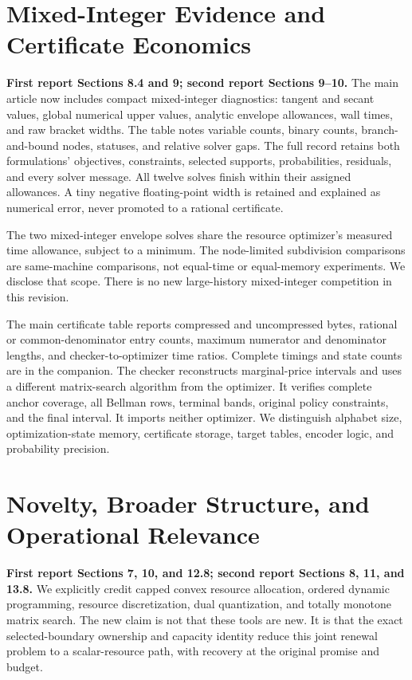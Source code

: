 \section{Mixed-Integer Evidence and Certificate Economics}
\textbf{First report Sections 8.4 and 9; second report Sections 9--10.}
The main article now includes compact mixed-integer diagnostics: tangent and secant values, global numerical upper values, analytic envelope allowances, wall times, and raw bracket widths. The table notes variable counts, binary counts, branch-and-bound nodes, statuses, and relative solver gaps. The full record retains both formulations' objectives, constraints, selected supports, probabilities, residuals, and every solver message. All twelve solves finish within their assigned allowances. A tiny negative floating-point width is retained and explained as numerical error, never promoted to a rational certificate.

The two mixed-integer envelope solves share the resource optimizer's measured time allowance, subject to a minimum. The node-limited subdivision comparisons are same-machine comparisons, not equal-time or equal-memory experiments. We disclose that scope. There is no new large-history mixed-integer competition in this revision.

The main certificate table reports compressed and uncompressed bytes, rational or common-denominator entry counts, maximum numerator and denominator lengths, and checker-to-optimizer time ratios. Complete timings and state counts are in the companion. The checker reconstructs marginal-price intervals and uses a different matrix-search algorithm from the optimizer. It verifies complete anchor coverage, all Bellman rows, terminal bands, original policy constraints, and the final interval. It imports neither optimizer. We distinguish alphabet size, optimization-state memory, certificate storage, target tables, encoder logic, and probability precision.

\section{Novelty, Broader Structure, and Operational Relevance}
\textbf{First report Sections 7, 10, and 12.8; second report Sections 8, 11, and 13.8.}
We explicitly credit capped convex resource allocation, ordered dynamic programming, resource discretization, dual quantization, and totally monotone matrix search. The new claim is not that these tools are new. It is that the exact selected-boundary ownership and capacity identity reduce this joint renewal problem to a scalar-resource path, with recovery at the original promise and budget.

